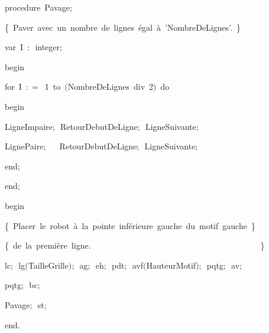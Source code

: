 {\pagebreak[3] 
\vspace{\neglskip}\mbox{\blc  \blk\idt  \mcl procedure\idt \ Pavage$;$}\par 
\vspace{\neglskip}\mbox{\blc  \blk\blk\idt  \cmt  \{\ Paver\ avec\ un\ nombre\ de\ lignes\ égal\ à\ {'}NombreDeLignes{'}.\ \}\idt }\par 
\pagebreak[3] 
\vspace{\neglskip}\mbox{\blc  \blk\blk\idt  \mcl var\idt \ I\ $:$\ integer$;$}\par 
\vspace{\neglskip}\mbox{\blc  \blk\idt  \mcl begin\idt }\par 
\pagebreak[3] 
\vspace{\neglskip}\mbox{\blc  \blk\blk\idt  \mcl for\idt \ I\ $:$$=$\ 1\ \mcl to\idt \ $($NombreDeLignes\ \mcl div\idt \ 2$)$\ \mcl do\idt }\par 
\vspace{\neglskip}\mbox{\blc  \blk\blk\blk\idt  \mcl begin\idt }\par 
\vspace{\neglskip}\mbox{\blc  \blk\blk\blk\blk\idt  LigneImpaire$;$\ RetourDebutDeLigne$;$\ LigneSuivante$;$\ }\par 
\vspace{\neglskip}\mbox{\blc  \blk\blk\blk\blk\idt  LignePaire$;$\ \ \ RetourDebutDeLigne$;$\ LigneSuivante$;$\ \ }\par 
\vspace{\neglskip}\mbox{\blc  \blk\blk\blk\idt  \mcl end\idt $;$}\par 
\vspace{\neglskip}\mbox{\blc  \blk\idt  \mcl end\idt $;$}\par 
\medskip

\vspace{\neglskip}\mbox{\blc  \idt  \mcl begin\idt }\par 
\vspace{\neglskip}\mbox{\blc  \blk\idt  \cmt  \{\ Placer\ le\ robot\ à\ la\ pointe\ inférieure\ gauche\ du\ motif\ gauche\ \}\idt }\par 
\vspace{\neglskip}\mbox{\blc  \blk\idt  \cmt  \{\ de\ la\ première\ ligne.\ \ \ \ \ \ \ \ \ \ \ \ \ \ \ \ \ \ \ \ \ \ \ \ \ \ \ \ \ \ \ \ \ \ \ \ \ \ \ \ \ \}\idt }\par 
\vspace{\neglskip}\mbox{\blc  \blk\idt  lc$;$\ lg$($TailleGrille$)$$;$\ ag$;$\ eh$;$\ pdt$;$\ avf$($HauteurMotif$)$$;$\ pqtg$;$\ av$;$\ }\par 
\vspace{\neglskip}\mbox{\blc  \blk\idt  pqtg$;$\ bc$;$\ }\par 
\vspace{\neglskip}\mbox{\blc  \blk\idt  Pavage$;$\ st$;$}\par 
\vspace{\neglskip}\mbox{\blc  \idt  \mcl end\idt $.$}\par 

\medskip }

